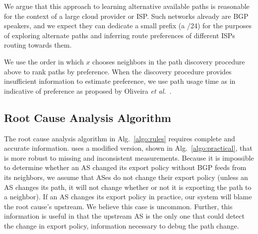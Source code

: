 We argue that this approach to learning alternative available paths is
reasonable for the context of a large cloud provider or ISP. Such
networks already are BGP speakers, and we expect they can dedicate a
small prefix (\eg a /24) for the purposes of exploring alternate paths and
inferring route preferences of different ISPs routing towards them.

 We use the order in which $x$
chooses neighbors in the path discovery procedure above to rank paths by
preference.  When the discovery procedure provides insufficient
information to estimate preference, we use path usage time as in
indicative of preference as proposed by Oliveira \emph{et
al.}~\cite{oliveira09exploration}.




\subsection{Root Cause Analysis Algorithm}

The root cause analysis algorithm in Alg.~\ref{algo:rules} requires
complete and accurate information. \ouralgo uses a modified version,
shown in Alg.~\ref{algo:practical}, that is more robust to missing and
inconsistent measurements. Because it is impossible to determine
whether an AS changed its export policy without BGP feeds from its
neighbors, we assume that ASes do not change their export policy (\ie unless 
an AS changes its path, it will not change whether or not it is exporting the path to a neighbor). 
If an AS
changes its export policy in practice, our system will blame the root
cause's upstream. We believe this case is uncommon. Further, 
this information is useful in that the upstream AS is the only one 
that could detect the change in export policy, information necessary 
to debug the path change.


